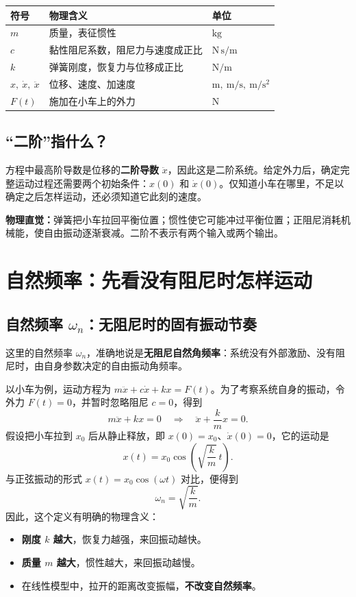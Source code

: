 \documentclass[UTF8,a4paper,11pt,fontset=windows]{ctexart}
\begin{document}
\noindent
\begin{tabularx}{\linewidth}{@{}lYl@{}}
\toprule
符号 & 物理含义 & 单位 \\
\midrule
$m$ & 质量，表征惯性 & $\mathrm{kg}$ \\
$c$ & 黏性阻尼系数，阻尼力与速度成正比 & $\mathrm{N\,s/m}$ \\
$k$ & 弹簧刚度，恢复力与位移成正比 & $\mathrm{N/m}$ \\
$x,\ \dot x,\ \ddot x$ & 位移、速度、加速度 & $\mathrm{m},\ \mathrm{m/s},\ \mathrm{m/s^2}$ \\
$F(t)$ & 施加在小车上的外力 & $\mathrm{N}$ \\
\bottomrule
\end{tabularx}

\subsection{“二阶”指什么？}
方程中最高阶导数是位移的\textbf{二阶导数} $\ddot x$，因此这是二阶系统。给定外力后，确定完整运动过程还需要两个初始条件：$x(0)$ 和 $\dot x(0)$。仅知道小车在哪里，不足以确定之后怎样运动，还必须知道它此刻的速度。

\begin{keybox}
\textbf{物理直觉：}弹簧把小车拉回平衡位置；惯性使它可能冲过平衡位置；正阻尼消耗机械能，使自由振动逐渐衰减。二阶不表示有两个输入或两个输出。
\end{keybox}

\newpage
\section{自然频率：先看没有阻尼时怎样运动}

\subsection{自然频率\texorpdfstring{ $\omega_n$}{ ωn}：无阻尼时的固有振动节奏}
这里的自然频率 $\omega_n$，准确地说是\textbf{无阻尼自然角频率}：系统没有外部激励、没有阻尼时，由自身参数决定的自由振动角频率。

以小车为例，运动方程为 $m\ddot x+c\dot x+kx=F(t)$。为了考察系统自身的振动，令外力 $F(t)=0$，并暂时忽略阻尼 $c=0$，得到
\[
  m\ddot x+kx=0
  \quad\Rightarrow\quad
  \ddot x+\frac{k}{m}x=0.
\]
假设把小车拉到 $x_0$ 后从静止释放，即 $x(0)=x_0$、$\dot x(0)=0$，它的运动是
\[
  x(t)=x_0\cos\left(\sqrt{\frac{k}{m}}\,t\right).
\]
与正弦振动的形式 $x(t)=x_0\cos(\omega t)$ 对比，便得到
\begin{equation}
  \boxed{\omega_n=\sqrt{\frac{k}{m}}.}
\end{equation}
因此，这个定义有明确的物理含义：
\begin{itemize}
  \item \textbf{刚度 $k$ 越大}，恢复力越强，来回振动越快。
  \item \textbf{质量 $m$ 越大}，惯性越大，来回振动越慢。
  \item 在线性模型中，拉开的距离改变振幅，\textbf{不改变自然频率}。
\end{itemize}
\end{document}
